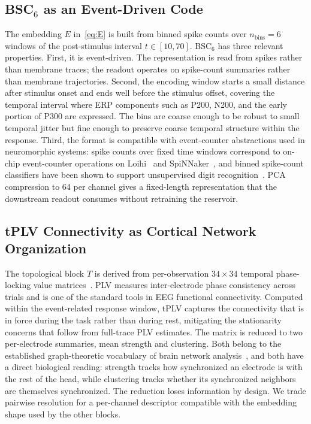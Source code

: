\documentclass[journal]{IEEEtran}
\begin{document}
\subsection{BSC$_6$ as an Event-Driven Code}
The embedding $E$ in~\eqref{eq:E} is built from binned spike counts over $n_{\text{bins}}=6$ windows of the post-stimulus interval $t\in[10,70]$. BSC$_6$ has three relevant properties. First, it is event-driven. The representation is read from spikes rather than membrane traces; the readout operates on spike-count summaries rather than membrane trajectories. Second, the encoding window starts a small distance after stimulus onset and ends well before the stimulus offset, covering the temporal interval where ERP components such as P200, N200, and the early portion of P300 are expressed. The bins are coarse enough to be robust to small temporal jitter but fine enough to preserve coarse temporal structure within the response. Third, the format is compatible with event-counter abstractions used in neuromorphic systems: spike counts over fixed time windows correspond to on-chip event-counter operations on Loihi~\cite{davies2018loihi} and SpiNNaker~\cite{furber2014spinnaker}, and binned spike-count classifiers have been shown to support unsupervised digit recognition~\cite{diehl2015unsupervised}. PCA compression to 64 per channel gives a fixed-length representation that the downstream readout consumes without retraining the reservoir.

\subsection{tPLV Connectivity as Cortical Network Organization}
The topological block $T$ is derived from per-observation $34\times34$ temporal phase-locking value matrices~\cite{lachaux1999plv}. PLV measures inter-electrode phase consistency across trials and is one of the standard tools in EEG functional connectivity. Computed within the event-related response window, tPLV captures the connectivity that is in force during the task rather than during rest, mitigating the stationarity concerns that follow from full-trace PLV estimates. The matrix is reduced to two per-electrode summaries, mean strength and clustering. Both belong to the established graph-theoretic vocabulary of brain network analysis~\cite{bullmore2009complex}, and both have a direct biological reading: strength tracks how synchronized an electrode is with the rest of the head, while clustering tracks whether its synchronized neighbors are themselves synchronized. The reduction loses information by design. We trade pairwise resolution for a per-channel descriptor compatible with the embedding shape used by the other blocks.
\end{document}
